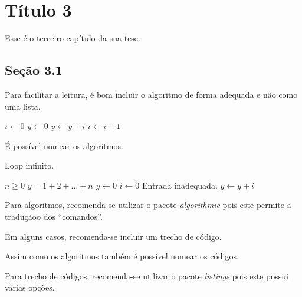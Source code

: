 \chapter{Título 3}
Esse é o terceiro capítulo da sua tese.

\section{Seção 3.1}
Para facilitar a leitura, é bom incluir o algoritmo de forma adequada e não
como uma lista.
\begin{algorithmic}[2]
  \STATE $i \leftarrow 0$
  \STATE $y \leftarrow 0$
    \STATE $y \leftarrow y + i$
    \STATE $i \leftarrow i + 1$
  \ENDFOR
\end{algorithmic}

É possível nomear os algoritmos.
\begin{algorithm}
  \caption{Loop infinito.}
  \label{alg:loop_inf}
  \begin{algorithmic}
    \REQUIRE $n \geq 0$
    \ENSURE $y = 1 + 2 + \ldots + n$
    \STATE $y \leftarrow 0$
    \STATE $i \leftarrow 0$
      \PRINT Entrada inadequada.
    \ELSE
        \STATE $y \leftarrow y + i$
      \ENDWHILE
    \ENDIF
  \end{algorithmic}
\end{algorithm}

Para algoritmos, recomenda-se utilizar o pacote
\emph{algorithmic} pois este
permite a traduçãoo dos ``comandos''.

Em alguns casos, recomenda-se incluir um trecho de
código.


Assim como os algoritmos também é possível nomear os códigos.


Para trecho de códigos,  recomenda-se utilizar o pacote
\emph{listings} pois
este possui várias opções.
